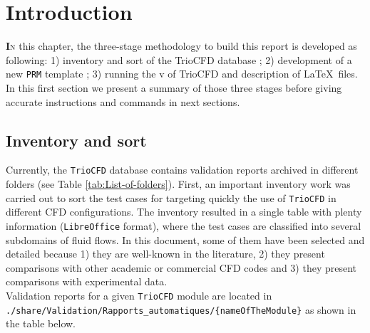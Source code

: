 \chapter{Introduction}

\lettrine[lines=2,slope=0pt,nindent=4pt]{\textbf{I}}{n} this chapter,
the three-stage methodology to build this report is developed as following:
1) inventory and sort of the \textsf{TrioCFD} database ;
2) development of a new \texttt{PRM} template ;
3) running the \textsf{v\codeVersion} of \textsf{TrioCFD} and description of \LaTeX~files.
In this first section we present a summary of those three stages before
giving accurate instructions and commands in next sections.

\section{Inventory and sort}
Currently, the \texttt{TrioCFD} database contains \nbValidationReports validation
reports archived in different folders (see Table \ref{tab:List-of-folders}).
First, an important inventory work was carried out to sort the test
cases for targeting quickly the use of \texttt{TrioCFD} in different
CFD configurations. The inventory resulted in a single table with
plenty information (\texttt{LibreOffice} format), where the test cases
are classified into several subdomains of fluid flows.
In this document, some of them have been selected and detailed because
1) they are well-known in the literature,
2) they present comparisons with other academic or commercial CFD codes and
3) they present comparisons with experimental data.\\

Validation reports for a given \texttt{TrioCFD} module are located in\\
\texttt{./share/Validation/Rapports\_automatiques/\{nameOfTheModule\}}
as shown in the table below.

